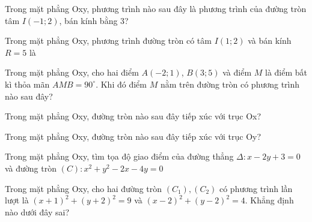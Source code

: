 \documentclass[12pt,a4paper]{book}
\begin{document}
\begin{ex}
Trong mặt phẳng Oxy, phương trình nào sau đây là phương trình của đường tròn tâm $I(-1;2)$, bán kính bằng 3?
\loigiai{}
\end{ex}

\begin{ex}
Trong mặt phẳng Oxy, phương trình đường tròn có tâm $I(1;2)$ và bán kính $R = 5$ là
\loigiai{}
\end{ex}

\begin{ex}
Trong mặt phẳng Oxy, cho hai điểm $A(-2;1)$, $B(3;5)$ và điểm $M$ là điểm bất kì thỏa mãn $AMB = 90^\circ$. Khi đó điểm $M$ nằm trên đường tròn có phương trình nào sau đây?
\loigiai{}
\end{ex}

\begin{ex}
Trong mặt phẳng Oxy, đường tròn nào sau đây tiếp xúc với trục Ox?
\loigiai{}
\end{ex}

\begin{ex}
Trong mặt phẳng Oxy, đường tròn nào sau đây tiếp xúc với trục Oy?
\loigiai{}
\end{ex}

\begin{ex}
Trong mặt phẳng Oxy, tìm tọa độ giao điểm của đường thẳng $\Delta : x - 2y + 3 = 0$ và đường tròn $(C): x^2 + y^2 - 2x - 4y = 0$
\loigiai{}
\end{ex}

\begin{ex}
Trong mặt phẳng Oxy, cho hai đường tròn $(C_1),(C_2)$ có phương trình lần lượt là $(x+1)^2 + (y+2)^2 = 9$ và $(x-2)^2 + (y-2)^2 = 4$. Khẳng định nào dưới đây sai?
\loigiai{}
\end{ex}
\end{document}
